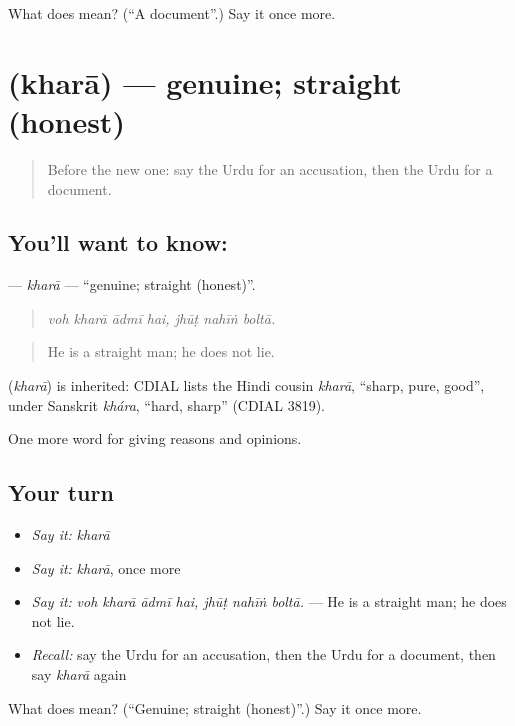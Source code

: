 \begin{tcolorbox}[breakable,colback=teal!4,colframe=teal!35!black,title={Before you move on}]
What does  mean? (\textquotedblleft{}A document\textquotedblright{}.) Say it once more.
\end{tcolorbox}
\section[\texorpdfstring{\ur{کھرا} (kharā)}{کھرا (kharā)}]{ (kharā) — genuine; straight (honest)}

\label{lesson:UR-C336-khara}



\begin{quote}
Before the new one: say the Urdu for an accusation, then the Urdu for a document.
\end{quote}

\subsection*{You'll want to know: }
\textbf{} — \emph{kharā} — \textquotedblleft{}genuine; straight (honest)\textquotedblright{}.

\begin{quote}
      
\end{quote}

\begin{quote}
\emph{voh kharā ādmī hai, jhūṭ nahīṅ boltā.}
\end{quote}

\begin{quote}
He is a straight man; he does not lie.
\end{quote}

\begin{cousinweb}
\textbf{} (\emph{kharā}) is inherited: CDIAL lists the Hindi cousin \emph{kharā}, \textquotedblleft{}sharp, pure, good\textquotedblright{}, under Sanskrit \emph{khára}, \textquotedblleft{}hard, sharp\textquotedblright{} (CDIAL 3819).
\end{cousinweb}

\begin{grammarlens}[title={What you've built}]
One more word for giving reasons and opinions.
\end{grammarlens}

\subsection*{Your turn}
\begin{itemize}
\raggedright
  \item \emph{Say it:} \emph{kharā}
  \item \emph{Say it:} \emph{kharā}, once more
  \item \emph{Say it:} \emph{voh kharā ādmī hai, jhūṭ nahīṅ boltā.} — He is a straight man; he does not lie.
  \item \emph{Recall:} say the Urdu for an accusation, then the Urdu for a document, then say \emph{kharā} again
\end{itemize}

\begin{tcolorbox}[breakable,colback=teal!4,colframe=teal!35!black,title={Before you move on}]
What does  mean? (\textquotedblleft{}Genuine; straight (honest)\textquotedblright{}.) Say it once more.
\end{tcolorbox}
